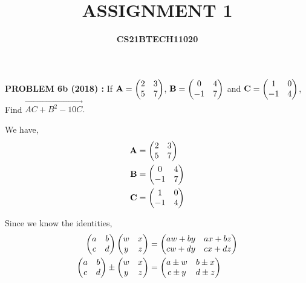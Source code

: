 \documentclass[journal,12pt,twocolumn]{IEEEtran}
\begin{document}

\title{\textbf{ASSIGNMENT 1}}
\author{\textbf{CS21BTECH11020}}
\date{}

\setlength{\parskip}{0.8em}


  \maketitle
  
  \textbf{PROBLEM 6b (2018) :} 
      If $\mathbf{A}=\begin{pmatrix}
        2 & 3 \\
        5 & 7 \\
      \end{pmatrix}$,
       $\mathbf{B}=\begin{pmatrix} 
        0 & 4 \\
       -1 & 7 \\
      \end{pmatrix}$ and $\mathbf{C} =\begin{pmatrix} 
        1 & 0 \\
        -1 & 4 \\
       \end{pmatrix}$, \vspace*{12pt}
       \\Find $\vec{AC+B^2-10C}.$


  \solution We have,
    \begin{align*}  
     \mathbf{A}&= \begin{pmatrix}
      2 & 3 \\
      5 & 7 \\
     \end{pmatrix}\\ 
     \mathbf{B}&=\begin{pmatrix} 
      0 & 4 \\
      -1 & 7 \\
      \end{pmatrix}\\
     \mathbf{C}&= \begin{pmatrix}
      1 & 0 \\
      -1 & 4 \\
      \end{pmatrix}
    \end{align*}

    Since we know the identities,
    \begin{align}
     \begin{pmatrix} 
        a & b \\
        c & d \\
      \end{pmatrix} 
     \begin{pmatrix} 
        w & x \\
        y & z \\
      \end{pmatrix} 
      &=
     \begin{pmatrix} 
        aw+by & ax+bz \\
        cw+dy & cx+dz \\
      \end{pmatrix} 
    \\
     \begin{pmatrix} 
        a & b \\
        c & d
      \end{pmatrix} 
      \pm
     \begin{pmatrix} 
        w & x \\
        y & z
      \end{pmatrix} 
      &=
     \begin{pmatrix} 
        a\pm w & b\pm x \\
        c\pm y & d\pm z
      \end{pmatrix} 
    \end{align}
    
\end{document}
